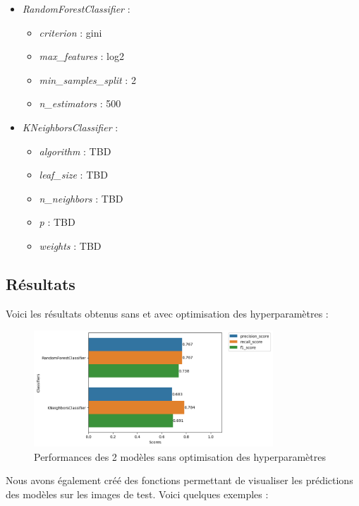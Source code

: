 \documentclass{article}
\begin{document}
\begin{small}
\begin{itemize}
    \item \textit{RandomForestClassifier} :
    \begin{itemize}
        \item \textit{criterion} : gini
        \item \textit{max\_features} : log2
        \item \textit{min\_samples\_split} : 2
        \item \textit{n\_estimators} : 500
    \end{itemize}
    \item \textit{KNeighborsClassifier} :
    \begin{itemize}
        \item \textit{algorithm} : TBD
        \item \textit{leaf\_size} : TBD
        \item \textit{n\_neighbors} : TBD
        \item \textit{p} : TBD
        \item \textit{weights} : TBD
    \end{itemize}
\end{itemize}
\end{small}

\subsection{Résultats}

Voici les résultats obtenus sans et avec optimisation des hyperparamètres :

\begin{figure}[h]
    \centering
    \includegraphics[width=0.8\textwidth]{img/img_perfs_without_cv_withou_hp.png}
    \caption{Performances des 2 modèles sans optimisation des hyperparamètres}
\end{figure}
\newpage

Nous avons également créé des fonctions permettant de visualiser les prédictions
des modèles sur les images de test. Voici quelques exemples : 
\end{document}
